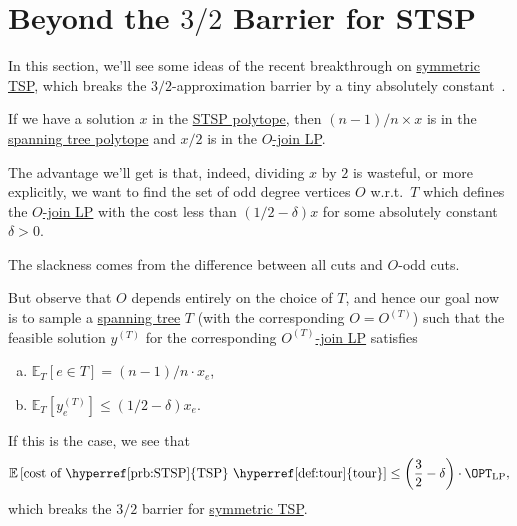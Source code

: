 \section{Beyond the \(3 / 2\) Barrier for STSP}
In this section, we'll see some ideas of the recent breakthrough on \hyperref[prb:STSP]{symmetric TSP}, which breaks the \(3 / 2\)-approximation barrier by a tiny absolutely constant~\cite{10.1145/3406325.3451009}.
\begin{prev}
	If we have a solution \(x\) in the \hyperref[eq:STSP-polytope]{STSP polytope}, then \((n-1) / n \times x\) is in the \hyperref[eq:spanning-tree-polytope]{spanning tree polytope} and \(x / 2\) is in the \hyperref[eq:O-join-LP]{\(O\)-join LP}.
\end{prev}

The advantage we'll get is that, indeed, dividing \(x\) by \(2\) is wasteful, or more explicitly, we want to find the set of odd degree vertices \(O\) w.r.t.\  \(T\) which defines the \hyperref[eq:O-join-LP]{\(O\)-join LP} with the cost less than \((1 / 2 - \delta )x\) for some absolutely constant \(\delta > 0\).

\begin{intuition}
	The slackness comes from the difference between all cuts and \(O\)-odd cuts.
\end{intuition}

But observe that \(O\) depends entirely on the choice of \(T\), and hence our goal now is to sample a \hyperref[def:spanning-tree]{spanning tree} \(T\) (with the corresponding \(O = O^{(T)}\)) such that the feasible solution \(y^{(T)}\) for the corresponding \hyperref[eq:O-join-LP]{\(O^{(T)}\)-join LP} satisfies
\begin{enumerate}[(a)]
	\item \(\mathbb{E}_{T}\left[e\in T \right] = (n-1) / n \cdot x_e\),
	\item \(\mathbb{E}_{T}\left[y^{(T)}_e \right] \leq (1 / 2 - \delta )x_e\).
\end{enumerate}
If this is the case, we see that
\[
	\mathbb{E}\left[ \text{cost of \hyperref[prb:STSP]{TSP} \hyperref[def:tour]{tour}} \right] \leq \left( \frac{3}{2} - \delta  \right) \cdot \OPT_{\mathrm{LP}},
\]
which breaks the \(3 / 2\) barrier for \hyperref[prb:STSP]{symmetric TSP}.

